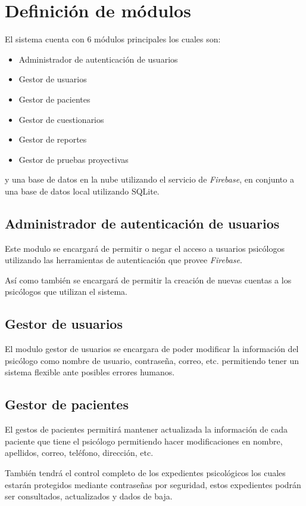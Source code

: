 \section{Definición de módulos}
El sistema cuenta con 6 módulos principales los cuales son:
\newline
\begin{itemize}
    \item Administrador de autenticación de usuarios
    \item Gestor de usuarios
    \item Gestor de pacientes
    \item Gestor de cuestionarios
    \item Gestor de reportes
    \item Gestor de pruebas proyectivas
\end{itemize}

y una base de datos en la nube utilizando el servicio de \textit{Firebase}, en conjunto a una base de datos local utilizando SQLite.

\subsection{Administrador de autenticación de usuarios}
Este modulo se encargará de permitir o negar el acceso a usuarios psicólogos utilizando las herramientas de autenticación que provee \textit{Firebase}.

Así como también se encargará de permitir la creación de nuevas cuentas a los psicólogos que utilizan el sistema.
\newline
\subsection{Gestor de usuarios}
El modulo gestor de usuarios se encargara de poder modificar la información del psicólogo como nombre de usuario, contraseña, correo, etc. permitiendo tener un sistema flexible ante posibles errores humanos.
\newline
\subsection{Gestor de pacientes}
El gestos de pacientes permitirá mantener actualizada la información de cada paciente que tiene el psicólogo permitiendo hacer modificaciones en nombre, apellidos, correo, teléfono, dirección, etc.

También tendrá el control completo de los expedientes psicológicos los cuales estarán protegidos mediante contraseñas por seguridad, estos expedientes podrán ser consultados, actualizados y dados de baja.
\newline
